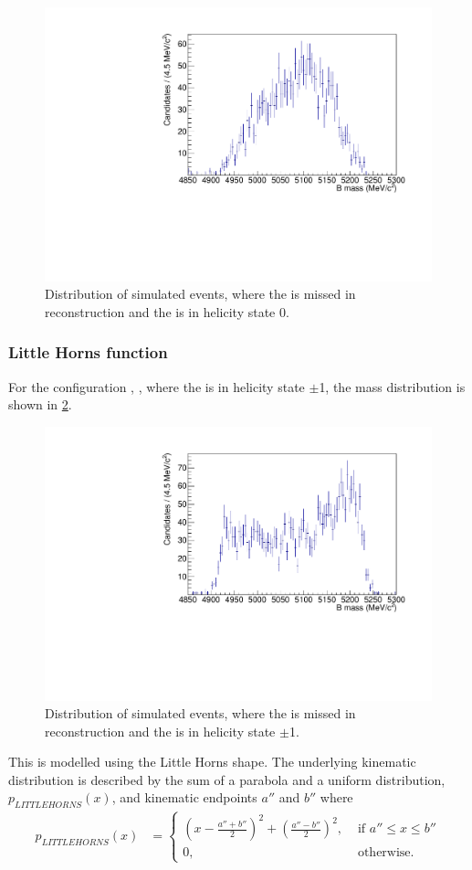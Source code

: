 \begin{figure}[h]
\centering
\includegraphics[width=0.5\linewidth]{figures/fitComponents/hill.pdf}
\caption{Distribution of simulated \decay{\Bm}{(\decay{\Dstarz}{\Dz\gamma})\Kstarm} events, where the \Pgamma is missed in reconstruction and the \Dstarz is in helicity state 0.}
\label{fig:hill}
\end{figure}

\subsubsection{Little Horns function}

For the configuration \decay{\Bm}{\Dstarz\Kstarm}, \decay{\Dstarz}{\Dz\gamma}, where the \Dstarz is in helicity state $\pm$1, the \Bm mass distribution is shown in \fig\ref{fig:littlehorns}.

\begin{figure}[h]
\centering
\includegraphics[width=0.5\linewidth]{figures/fitComponents/littlehorns.pdf}
\caption{Distribution of simulated \decay{\Bm}{(\decay{\Dstarz}{\Dz\gamma})\Kstarm} events, where the \Pgamma is missed in reconstruction and the \Dstarz is in helicity state $\pm$1.}
\label{fig:littlehorns}
\end{figure}
This is modelled using the Little Horns shape. The underlying kinematic distribution is described by the sum of a parabola and a uniform distribution, $p_{LITTLEHORNS}(x)$, and kinematic endpoints $a''$ and $b''$ where
\begin{align}
p_{LITTLEHORNS}(x) &= \begin{cases}
\left(x - \frac{a''+b''}{2}\right)^2 + \left(\frac{a''-b''}{2}\right)^2, & \text{ if $a'' \leq x \leq b''$}\\ 	
0, & \text{ otherwise.}
\end{cases} 
\end{align}

